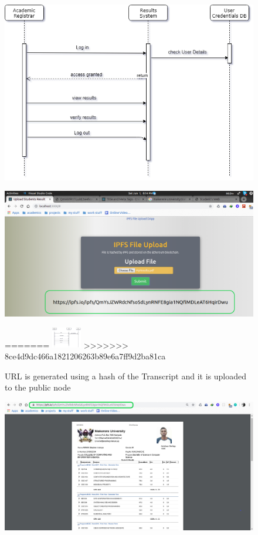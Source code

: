 \begin{enumerate}
\begin{figure}[H]
\includegraphics[scale=0.4]{images/SequenceRegistrar.png}
\end{figure}
\begin{figure}[H]
\includegraphics[scale=0.4]{images/UploadToIPFS.png}
\caption{URL is generated using a hash of the Transcript and it is uploaded to the public node}
=======
\includegraphics[width=1.3cm]{images/SequenceRegistrar.png}
>>>>>>> 8ce4d9dc466a1821206263b89e6a7ff9d2ba81ca
\end{figure}
\begin{figure}[H]
\includegraphics[scale=0.4]{images/RevealIPFS.png}

\end{figure}
\end{enumerate}
